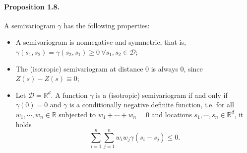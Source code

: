 \documentclass{article}
\begin{document}
\paragraph{Proposition 1.8.}  A semivariogram $\gamma$ has the following properties:
\begin{itemize}
	\item A semivariogram is nonnegative and symmetric, that is, $\gamma(s_1,s_2)=\gamma(s_2,s_1) \geq 0\ \forall s_1,s_2\in\mathcal{D}$;
	\item The (isotropic) semivariogram at distance 0 is always 0, since $Z(s) - Z(s) \equiv 0$;
	\item Let $\mathcal{D}=\mathbb{R}^d.$ A function $\gamma$ is a (isotropic) semivariogram if and only if $\gamma(0)=0$ and $\gamma$ is a conditionally negative definite function, i.e. for all $w_1,\cdots,w_n\in\mathbb{R}$ subjected to $w_1+\cdots + w_n = 0$ and locations $s_1,\cdots,s_n \in\mathbb{R}^d$, it holds
	\begin{equation*}
		\sum_{i=1}^n\sum_{j=1}^n w_iw_j\gamma(s_i-s_j) \leq 0.\tag{1.11}
	\end{equation*}
\end{itemize} 
\end{document}
